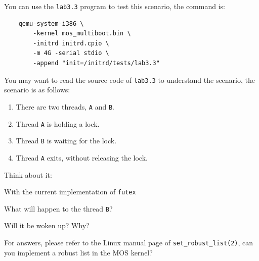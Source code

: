 You can use the \texttt{lab3.3} program to test this scenario, the command is:

\begin{verbatim}
    qemu-system-i386 \
        -kernel mos_multiboot.bin \
        -initrd initrd.cpio \
        -m 4G -serial stdio \
        -append "init=/initrd/tests/lab3.3"
\end{verbatim}

You may want to read the source code of \texttt{lab3.3} to understand the
scenario, the scenario is as follows:

\begin{enumerate}
    \item There are two threads, \texttt{A} and \texttt{B}.
    \item Thread \texttt{A} is holding a lock.
    \item Thread \texttt{B} is waiting for the lock.
    \item Thread \texttt{A} exits, without releasing the lock.
\end{enumerate}

\begin{exercise*}{Think about it:}
    \item With the current implementation of \texttt{futex}
    \item What will happen to the thread \texttt{B}?
    \item Will it be woken up? Why?
\end{exercise*}

\noindent
For answers, please refer to the Linux manual page of \texttt{set\_robust\_list(2)}, can you
implement a robust list in the MOS kernel?
